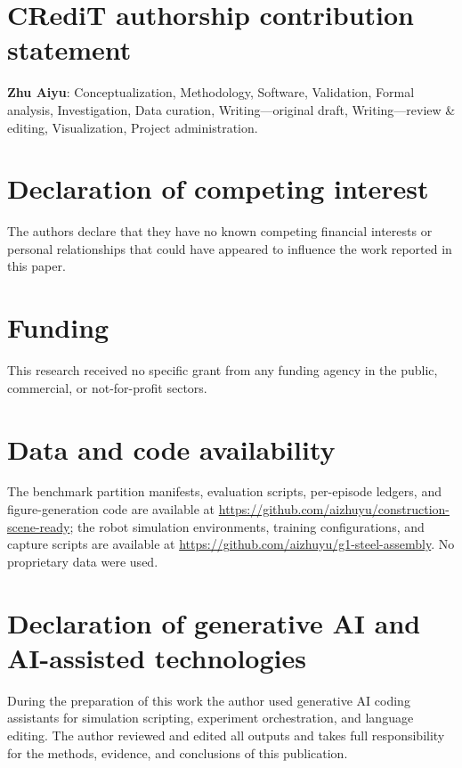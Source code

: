 \documentclass[final,twocolumn,12pt]{elsarticle}
\begin{document}
\section*{CRediT authorship contribution statement}
\textbf{Zhu Aiyu}: Conceptualization, Methodology, Software, Validation,
Formal analysis, Investigation, Data curation, Writing---original draft,
Writing---review \& editing, Visualization, Project administration.

\section*{Declaration of competing interest}
The authors declare that they have no known competing financial interests or
personal relationships that could have appeared to influence the work reported
in this paper.

\section*{Funding}
This research received no specific grant from any funding agency in the
public, commercial, or not-for-profit sectors.

\section*{Data and code availability}
The benchmark partition manifests, evaluation scripts, per-episode ledgers,
and figure-generation code are available at
\url{https://github.com/aizhuyu/construction-scene-ready}; the robot
simulation environments, training configurations, and capture scripts are
available at \url{https://github.com/aizhuyu/g1-steel-assembly}. No
proprietary data were used.

\section*{Declaration of generative AI and AI-assisted technologies}
During the preparation of this work the author used generative AI coding
assistants for simulation scripting, experiment orchestration, and language
editing. The author reviewed and edited all outputs and takes full
responsibility for the methods, evidence, and conclusions of this
publication.



\end{document}
